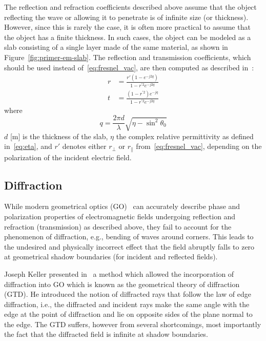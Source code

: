 The reflection and refraction coefficients described above assume that the object reflecting the wave or allowing it to penetrate is of infinite size (or thickness). However, since this is rarely the case, it is often more practical to assume that the object has a finite thickness. In such cases, the object can be modeled as a slab consisting of a single layer made of the same material, as shown in Figure~\ref{fig:primer-em-slab}. The reflection and transmission coefficients, which should be used instead of~\eqref{eq:fresnel_vac}, are then computed as described in~\cite[Section~2.2.2.2]{ITU_R_P2040}:
\begin{align}
    \label{eq:fresnel_slab}
    r &= \frac{r'\left(1-e^{-j2q}\right)}{1-r^{'2}e^{-j2q}} \\
    t &= \frac{\left(1-r^{'2}\right)e^{-jq}}{1-r^{'2}e^{-j2q}}
\end{align}
where
\begin{equation}
    \label{eq:q_fresnel_slab}
    q = \frac{2\pi d}{\lambda} \sqrt{\eta - \sin^2 \theta_0}
\end{equation}
$d$ [\si{\meter}] is the thickness of the slab, $\eta$ the complex relative permittivity as defined in~\eqref{eq:eta}, and $r'$ denotes either $r_{\perp}$ or
$r_{\parallel}$ from~\eqref{eq:fresnel_vac}, depending on the polarization of the incident electric field.

\subsection{Diffraction}
\label{sec:primer-em-diffraction}

While modern geometrical optics (GO)~\cite{Kline51,Luneburg64} can accurately describe phase and polarization properties of electromagnetic fields undergoing reflection and refraction (transmission) as described above, they fail to account for the phenomenon of diffraction, e.g., bending of waves around corners. This leads to the undesired and physically incorrect effect that the field abruptly falls to zero at geometrical shadow boundaries (for incident and reflected fields).

Joseph Keller presented in~\cite{Keller:62} a method which allowed the incorporation of diffraction into GO which is known as the geometrical theory of diffraction (GTD). He introduced the notion of diffracted rays that follow the law of edge diffraction, i.e., the diffracted and incident rays make the same angle with the edge at the point of diffraction and lie on opposite sides of the plane normal to the edge. The GTD suffers, however from several shortcomings, most importantly the fact that the diffracted field is infinite at shadow boundaries.

